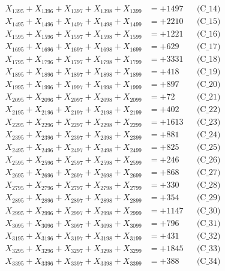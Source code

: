 \documentclass[a4paper,10pt]{article}
\begin{document}
{\begin{align}
X_{1395} + X_{1396} + X_{1397} + X_{1398} + X_{1399} &= +1497 && \text{(C\_14)} \\
X_{1495} + X_{1496} + X_{1497} + X_{1498} + X_{1499} &= +2210 && \text{(C\_15)} \\
\allowbreak
X_{1595} + X_{1596} + X_{1597} + X_{1598} + X_{1599} &= +1221 && \text{(C\_16)} \\
X_{1695} + X_{1696} + X_{1697} + X_{1698} + X_{1699} &= +629 && \text{(C\_17)} \\
X_{1795} + X_{1796} + X_{1797} + X_{1798} + X_{1799} &= +3331 && \text{(C\_18)} \\
X_{1895} + X_{1896} + X_{1897} + X_{1898} + X_{1899} &= +418 && \text{(C\_19)} \\
X_{1995} + X_{1996} + X_{1997} + X_{1998} + X_{1999} &= +897 && \text{(C\_20)} \\
\allowbreak
X_{2095} + X_{2096} + X_{2097} + X_{2098} + X_{2099} &= +72 && \text{(C\_21)} \\
X_{2195} + X_{2196} + X_{2197} + X_{2198} + X_{2199} &= +402 && \text{(C\_22)} \\
X_{2295} + X_{2296} + X_{2297} + X_{2298} + X_{2299} &= +1613 && \text{(C\_23)} \\
X_{2395} + X_{2396} + X_{2397} + X_{2398} + X_{2399} &= +881 && \text{(C\_24)} \\
X_{2495} + X_{2496} + X_{2497} + X_{2498} + X_{2499} &= +825 && \text{(C\_25)} \\
\allowbreak
X_{2595} + X_{2596} + X_{2597} + X_{2598} + X_{2599} &= +246 && \text{(C\_26)} \\
X_{2695} + X_{2696} + X_{2697} + X_{2698} + X_{2699} &= +868 && \text{(C\_27)} \\
X_{2795} + X_{2796} + X_{2797} + X_{2798} + X_{2799} &= +330 && \text{(C\_28)} \\
X_{2895} + X_{2896} + X_{2897} + X_{2898} + X_{2899} &= +354 && \text{(C\_29)} \\
X_{2995} + X_{2996} + X_{2997} + X_{2998} + X_{2999} &= +1147 && \text{(C\_30)} \\
\allowbreak
X_{3095} + X_{3096} + X_{3097} + X_{3098} + X_{3099} &= +796 && \text{(C\_31)} \\
X_{3195} + X_{3196} + X_{3197} + X_{3198} + X_{3199} &= +431 && \text{(C\_32)} \\
X_{3295} + X_{3296} + X_{3297} + X_{3298} + X_{3299} &= +1845 && \text{(C\_33)} \\
X_{3395} + X_{3396} + X_{3397} + X_{3398} + X_{3399} &= +388 && \text{(C\_34)} \\

\end{align}}
\end{document}
